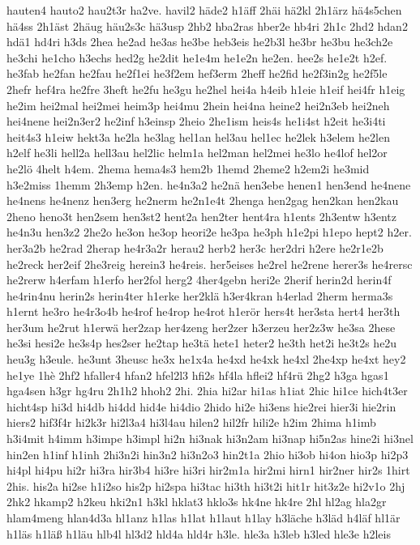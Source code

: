 {hauten4
hauto2
hau2t3r
ha2ve.
havil2
häde2
h1äff
2häi
hä2kl
2h1ärz
hä4s5chen
hä4ss
2h1äst
2häug
häu2s3c
hä3usp
2hb2
hba2ras
hber2e
hb4ri
2h1c
2hd2
hdan2
hdä1
hd4ri
h3ds
2hea
he2ad
he3as
he3be
heb3eis
he2b3l
he3br
he3bu
he3ch2e
he3chi
he1cho
h3echs
hed2g
he2dit
he1e4m
he1e2n
he2en.
hee2s
he1e2t
h2ef.
he3fab
he2fan
he2fau
he2f1ei
he3f2em
hef3erm
2heff
he2fid
he2f3in2g
he2f5le
2hefr
hef4ra
he2fre
3heft
he2fu
he3gu
he2hel
hei4a
h4eib
h1eie
h1eif
hei4fr
h1eig
he2im
hei2mal
hei2mei
heim3p
hei4mu
2hein
hei4na
heine2
hei2n3eb
hei2neh
hei4nene
hei2n3er2
he2inf
h3einsp
2heio
2he1ism
heis4s
he1i4st
h2eit
he3i4ti
heit4s3
h1eiw
hekt3a
he2la
he3lag
hel1an
hel3au
hel1ec
he2lek
h3elem
he2len
h2elf
he3li
hell2a
hell3au
hel2lic
helm1a
hel2man
hel2mei
he3lo
he4lof
hel2or
he2lö
4helt
h4em.
2hema
hema4s3
hem2b
1hemd
2heme2
h2em2i
he3mid
h3e2miss
1hemm
2h3emp
h2en.
he4n3a2
he2nä
hen3ebe
henen1
hen3end
he4nene
he4nens
he4nenz
hen3erg
he2nerm
he2n1e4t
2henga
hen2gag
hen2kan
hen2kau
2heno
heno3t
hen2sem
hen3st2
hent2a
hen2ter
hent4ra
h1ents
2h3entw
h3entz
he4n3u
hen3z2
2he2o
he3on
he3op
heori2e
he3pa
he3ph
h1e2pi
h1epo
hept2
h2er.
her3a2b
he2rad
2herap
he4r3a2r
herau2
herb2
her3c
her2dri
h2ere
he2r1e2b
he2reck
her2eif
2he3reig
herein3
he4reis.
her5eises
he2rel
he2rene
herer3s
he4rersc
he2rerw
h4erfam
h1erfo
her2fol
herg2
4her4gebn
heri2e
2herif
herin2d
herin4f
he4rin4nu
herin2s
herin4ter
h1erke
her2klä
h3er4kran
h4erlad
2herm
herma3s
h1ernt
he3ro
he4r3o4b
he4rof
he4rop
he4rot
h1erör
hers4t
her3sta
hert4
her3th
her3um
he2rut
h1erwä
her2zap
her4zeng
her2zer
h3erzeu
her2z3w
he3sa
2hese
he3si
hesi2e
he3s4p
hes2ser
he2tap
he3tä
hete1
heter2
he3th
het2i
he3t2s
he2u
heu3g
h3eule.
he3unt
3heusc
he3x
he1x4a
he4xd
he4xk
he4xl
2he4xp
he4xt
hey2
he1ye
1hè
2hf2
hfaller4
hfan2
hfel2l3
hfi2s
hf4la
hflei2
hf4rü
2hg2
h3ga
hgas1
hga4sen
h3gr
hg4ru
2h1h2
hhoh2
2hi.
2hia
hi2ar
hi1as
h1iat
2hic
hi1ce
hich4t3er
hicht4sp
hi3d
hi4db
hi4dd
hid4e
hi4dio
2hido
hi2e
hi3ens
hie2rei
hier3i
hie2rin
hiers2
hif3f4r
hi2k3r
hi2l3a4
hi3l4au
hilen2
hil2fr
hili2e
h2im
2hima
h1imb
h3i4mit
h4imm
h3impe
h3impl
hi2n
hi3nak
hi3n2am
hi3nap
hi5n2as
hine2i
hi3nel
hin2en
h1inf
h1inh
2hi3n2i
hin3n2
hi3n2o3
hin2t1a
2hio
hi3ob
hi4on
hio3p
hi2p3
hi4pl
hi4pu
hi2r
hi3ra
hir3b4
hi3re
hi3ri
hir2m1a
hir2mi
hirn1
hir2ner
hir2s
1hirt
2his.
his2a
hi2se
h1i2so
his2p
hi2spa
hi3tac
hi3th
hi3t2i
hit1r
hit3z2e
hi2v1o
2hj
2hk2
hkamp2
h2keu
hki2n1
h3kl
hklat3
hklo3s
hk4ne
hk4re
2hl
hl2ag
hla2gr
hlam4meng
hlan4d3a
hl1anz
h1las
h1lat
h1laut
h1lay
h3läche
h3läd
h4läf
hl1är
h1läs
h1läß
h1läu
hlb4l
hl3d2
hld4a
hld4r
h3le.
hle3a
h3leb
h3led
hle3e
h2leis
}
